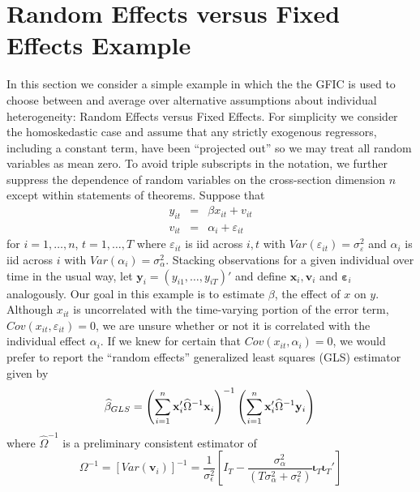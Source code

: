 \section{Random Effects versus Fixed Effects Example}
\label{sec:REvsFE}
In this section we consider a simple example in which the the GFIC is used to choose between and average over alternative assumptions about individual heterogeneity: Random Effects versus Fixed Effects.
For simplicity we consider the homoskedastic case and assume that any strictly exogenous regressors, including a constant term, have been ``projected out'' so we may treat all random variables as mean zero.
To avoid triple subscripts in the notation, we further suppress the dependence of random variables on the cross-section dimension $n$ except within statements of theorems.
Suppose that
\begin{eqnarray}
  y_{it} &=& \beta x_{it}+ v_{it}\\
  v_{it} &=& \alpha_i + \varepsilon_{it}
  \label{eq:REvsFEmodel}
\end{eqnarray}
for $i = 1, \hdots, n$, $t=1, \hdots, T$ where $\varepsilon_{it}$ is iid across $i,t$ with $Var(\varepsilon_{it}) = \sigma^2_{\varepsilon}$ and $\alpha_i$ is iid across $i$ with $Var\left( \alpha_i \right)=\sigma^2_{\alpha}$.
Stacking observations for a given individual over time in the usual way, let $\mathbf{y}_i = (y_{i1}, \hdots, y_{iT})'$ and define $\mathbf{x}_i, \mathbf{v}_i$ and $\boldsymbol{\varepsilon}_i$ analogously.
Our goal in this example is to estimate $\beta$, the effect of $x$ on $y$.
Although $x_{it}$ is uncorrelated with the time-varying portion of the error term, $Cov(x_{it},\varepsilon_{it})=0$, we are unsure whether or not it is correlated with the individual effect $\alpha_i$. 
If we knew for certain that $Cov(x_{it},\alpha_i)=0$, we would prefer to report the ``random effects'' generalized least squares (GLS) estimator given by
\begin{equation}
  \widehat{\beta}_{GLS} = \left(\sum_{i=1}^{n} \mathbf{x}_i' \widehat{\Omega}^{-1} \mathbf{x}_i\right)^{-1}\left(\sum_{i=1}^{n} \mathbf{x}_i'  \widehat{\Omega}^{-1} \mathbf{y}_i   \right)\\
  \label{eq:REdef}
\end{equation}
where $\widehat{\Omega}^{-1}$ is a preliminary consistent estimator of 
\begin{equation}
  \Omega^{-1} = [Var(\mathbf{v}_i)]^{-1} = \frac{1}{\sigma_\epsilon^2} \left[I_T - \frac{\sigma_\alpha^2}{(T\sigma_\alpha^2 + \sigma_\epsilon^2)} \boldsymbol{\iota}_T\boldsymbol{\iota}_T'\right]
  \label{eq:OmegaInvRE}
\end{equation}
